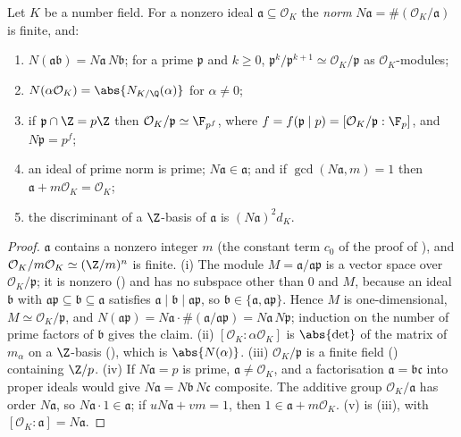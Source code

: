 \begin{proposition}\label{prop:ant:idealnorm}
Let $K$ be a number field. For a nonzero ideal $\mathfrak a\subseteq\mathcal O_K$ the \emph{norm} $N\mathfrak a=\#(\mathcal O_K/\mathfrak a)$ is finite, and:
\begin{enumerate}[label=(\roman*)]
\item $N(\mathfrak a\mathfrak b)=N\mathfrak a\,N\mathfrak b$; for a prime $\mathfrak p$ and $k\ge0$, $\mathfrak p^k/\mathfrak p^{k+1}\simeq\mathcal O_K/\mathfrak p$ as $\mathcal O_K$-modules;
\item $N(\alpha\mathcal O_K)=\abs{N_{K/\Q}(\alpha)}$ for $\alpha\ne0$;
\item if $\mathfrak p\cap\Z=p\Z$ then $\mathcal O_K/\mathfrak p\simeq\F_{p^f}$, where $f=f(\mathfrak p\mid p)=[\mathcal O_K/\mathfrak p:\F_p]$, and $N\mathfrak p=p^f$;
\item an ideal of prime norm is prime; $N\mathfrak a\in\mathfrak a$; and if $\gcd(N\mathfrak a,m)=1$ then $\mathfrak a+m\mathcal O_K=\mathcal O_K$;
\item the discriminant of a $\Z$-basis of $\mathfrak a$ is $(N\mathfrak a)^2d_K$.
\end{enumerate}
\end{proposition}

\begin{proof}
$\mathfrak a$ contains a nonzero integer $m$ (the constant term $c_0$ of the proof of ), and $\mathcal O_K/m\mathcal O_K\simeq(\Z/m)^n$
is finite. (i) The module $M=\mathfrak a/\mathfrak a\mathfrak p$ is a vector space over $\mathcal O_K/\mathfrak p$; it is nonzero
() and has no subspace other than $0$ and $M$, because an ideal $\mathfrak b$ with $\mathfrak a\mathfrak p\subseteq
\mathfrak b\subseteq\mathfrak a$ satisfies $\mathfrak a\mid\mathfrak b\mid\mathfrak a\mathfrak p$, so $\mathfrak b\in\{\mathfrak a,\mathfrak a\mathfrak p\}$. Hence $M$ is
one-dimensional, $M\simeq\mathcal O_K/\mathfrak p$, and $N(\mathfrak a\mathfrak p)=N\mathfrak a\cdot\#(\mathfrak a/\mathfrak a\mathfrak p)=N\mathfrak a\,N\mathfrak p$;
induction on the number of prime factors of $\mathfrak b$ gives the claim. (ii) $[\mathcal O_K:\alpha\mathcal O_K]$ is $\abs{\det}$ of the matrix of
$m_\alpha$ on a $\Z$-basis (), which is $\abs{N(\alpha)}$. (iii) $\mathcal O_K/\mathfrak p$ is a finite field
() containing $\Z/p$. (iv) If $N\mathfrak a=p$ is prime, $\mathfrak a\ne\mathcal O_K$, and a factorisation
$\mathfrak a=\mathfrak b\mathfrak c$ into proper ideals would give $N\mathfrak a=N\mathfrak b\,N\mathfrak c$ composite. The additive group
$\mathcal O_K/\mathfrak a$ has order $N\mathfrak a$, so $N\mathfrak a\cdot1\in\mathfrak a$; if $uN\mathfrak a+vm=1$, then $1\in\mathfrak a+m\mathcal O_K$.
(v) is (iii), with $[\mathcal O_K:\mathfrak a]=N\mathfrak a$.
\end{proof}

